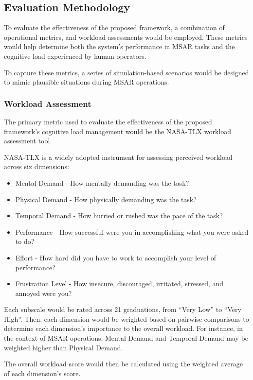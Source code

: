 \subsection{Evaluation Methodology}\label{subsec:evaluation-methodology}

To evaluate the effectiveness of the proposed framework, a combination of operational metrics, and workload assessments would be employed.
These metrics would help determine both the system's performance in MSAR tasks and the cognitive load experienced by human operators.

To capture these metrics, a series of simulation-based scenarios would be designed to mimic plausible situations during MSAR operations.

\subsubsection{Workload Assessment}
The primary metric used to evaluate the effectiveness of the proposed framework's cognitive load management would be the NASA-TLX workload assessment tool.

NASA-TLX \citep{HART1988139} is a widely adopted instrument for assessing perceived workload across six dimensions:

\begin{itemize}
    \item Mental Demand - How mentally demanding was the task?
    \item Physical Demand - How physically demanding was the task?
    \item Temporal Demand - How hurried or rushed was the pace of the task?
    \item Performance - How successful were you in accomplishing what you were asked to do?
    \item Effort - How hard did you have to work to accomplish your level of performance?
    \item Frustration Level - How insecure, discouraged, irritated, stressed, and annoyed were you?
\end{itemize}

Each subscale would be rated across 21 graduations, from ``Very Low'' to ``Very High''.
Then, each dimension would be weighted based on pairwise comparisons to determine each dimension's importance to the overall workload.
For instance, in the context of MSAR operations, Mental Demand and Temporal Demand may be weighted higher than Physical Demand.

The overall workload score would then be calculated using the weighted average of each dimension's score.


